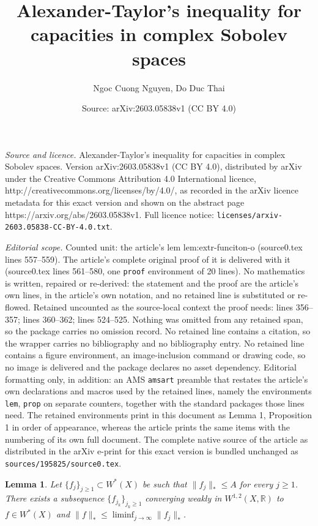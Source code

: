 \documentclass[10pt,a4paper]{amsart}
\title{Alexander-Taylor's inequality for capacities in complex Sobolev spaces}
\author{Ngoc Cuong Nguyen, Do Duc Thai}
\date{Source: arXiv:2603.05838v1 (CC BY 4.0)}
\newtheorem{lem}{Lemma}
\newcommand{\bR}{\mathbb{R}}
\begin{document}
\maketitle

\noindent\emph{Source and licence.} Alexander-Taylor's inequality for capacities in complex Sobolev spaces. Version arXiv:2603.05838v1 (CC BY 4.0), distributed by arXiv under the Creative Commons Attribution 4.0 International licence, http://creativecommons.org/licenses/by/4.0/, as recorded in the arXiv licence metadata for this exact version and shown on the abstract page https://arxiv.org/abs/2603.05838v1. Full licence notice: \texttt{licenses/arxiv-2603.05838-CC-BY-4.0.txt}.\par\smallskip

\noindent\textit{Editorial scope.} Counted unit: the article's lem lem:extr-funciton-o (source0.tex lines 557--559). The article's complete original proof of it is delivered with it (source0.tex lines 561--580, one \texttt{proof} environment of 20 lines). No mathematics is written, repaired or re-derived: the statement and the proof are the article's own lines, in the article's own notation, and no retained line is substituted or re-flowed.  Retained uncounted as the source-local context the proof needs: lines 356--357; lines 360--362; lines 524--525.  Nothing was omitted from any retained span, so the package carries no omission record.  No retained line contains a citation, so the wrapper carries no bibliography and no bibliography entry.  No retained line contains a figure environment, an image-inclusion command or drawing code, so no image is delivered and the package declares no asset dependency.  Editorial formatting only, in addition: an AMS \texttt{amsart} preamble that restates the article's own declarations and macros used by the retained lines, namely the environments \texttt{lem}, \texttt{prop} on separate counters, together with the standard packages those lines need.  The retained environments print in this document as Lemma 1, Proposition 1 in order of appearance, whereas the article prints the same items with the numbering of its own full document.  The complete native source of the article as distributed in the arXiv e-print for this exact version is bundled unchanged as \texttt{sources/195825/source0.tex}.
\begin{lem} \label{lem:w-compactness}  Let $\{f_j \}_{j\geq 1} \subset W^*(X)$ be such that $\|f_j \|_* \leq A$ for every $j\geq 1$. There exists a subsequence $\{f_{j_k} \}_{j_k \geq 1}$ converging weakly in $W^{1,2}(X,\bR)$ to $f \in W^*(X)$  and $\|f\|_* \leq \liminf_{j\to \infty} \|f_j\|_*$.
\end{lem}
\end{document}
